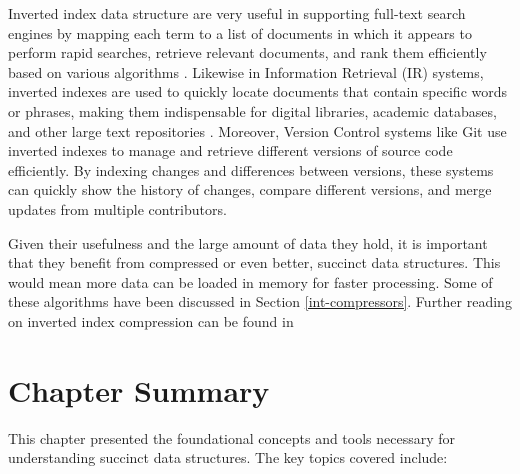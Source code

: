 Inverted index data structure are very useful in supporting full-text search engines by mapping each term to a list of documents in which it appears to perform rapid searches, retrieve relevant documents, and rank them efficiently based on various algorithms \cite{Pibiri_2017}. Likewise in Information Retrieval (IR) systems, inverted indexes are used to quickly locate documents that contain specific words or phrases, making them indispensable for digital libraries, academic databases, and other large text repositories \cite{Manning_2008}. Moreover, Version Control systems like Git use inverted indexes to manage and retrieve different versions of source code efficiently. By indexing changes and differences between versions, these systems can quickly show the history of changes, compare different versions, and merge updates from multiple contributors.\par
Given their usefulness and the large amount of data they hold, it is important that they benefit from compressed or even better, succinct data structures. This would mean more data can be loaded in memory for faster processing. Some of these algorithms have been discussed in Section \ref{int-compressors}. Further reading on inverted index compression can be found in \cite{ Anh_2002, Anh_2005, Pibiri_2017, Zobel_2006}

\section{Chapter Summary}

This chapter presented the foundational concepts and tools necessary for understanding succinct data structures. The key topics covered include:

